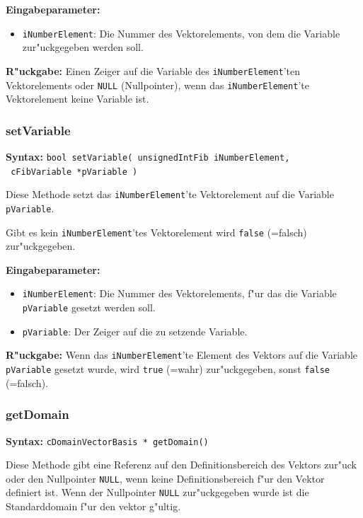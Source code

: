 \bigskip\noindent
\textbf{Eingabeparameter:}
\begin{itemize}
 \item \verb|iNumberElement|: Die Nummer des Vektorelements, von dem die Variable zur"uckgegeben werden soll.
\end{itemize}

\bigskip\noindent
\textbf{R"uckgabe:} Einen Zeiger auf die Variable des \verb|iNumberElement|'ten Vektorelements oder \verb|NULL| (Nullpointer), wenn das \verb|iNumberElement|'te Vektorelement keine Variable ist.


\subsubsection{setVariable}

\textbf{Syntax:} \verb|bool setVariable( unsignedIntFib iNumberElement,| \\\verb| cFibVariable *pVariable )|

\bigskip\noindent
Diese Methode setzt das \verb|iNumberElement|'te Vektorelement auf die Variable \verb|pVariable|.

Gibt es kein \verb|iNumberElement|'tes Vektorelement wird \verb|false| (=falsch) zur"uckgegeben.

\bigskip\noindent
\textbf{Eingabeparameter:}
\begin{itemize}
 \item \verb|iNumberElement|: Die Nummer des Vektorelements, f"ur das die Variable \verb|pVariable| gesetzt werden soll.
 \item \verb|pVariable|: Der Zeiger auf die zu setzende Variable.
\end{itemize}

\bigskip\noindent
\textbf{R"uckgabe:} Wenn das \verb|iNumberElement|'te Element des Vektors auf die Variable \verb|pVariable| gesetzt wurde, wird \verb|true| (=wahr) zur"uckgegeben, sonst \verb|false| (=falsch).


\subsubsection{getDomain}

\textbf{Syntax:} \verb|cDomainVectorBasis * getDomain()|

\bigskip\noindent
Diese Methode gibt eine Referenz auf den Definitionsbereich des Vektors zur"uck oder den Nullpointer \verb|NULL|, wenn keine Definitionsbereich f"ur den Vektor definiert ist.
Wenn der Nullpointer \verb|NULL| zur"uckgegeben wurde ist die Standarddomain f"ur den vektor g"ultig.

